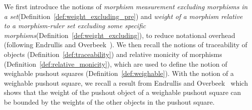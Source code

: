 
We first introduce the notions of \emph{morphism measurement excluding morphisms in a set}(Definition~\ref{def:weight_excluding_pre}) and \emph{weight of a morphism relative to a morphism-ruler set excluding some specific morphisms}(Definition~\ref{def:weight_excluding}),
to reduce notational overhead (following Endrullis and Overbeek~\cite{endrullis2024generalized_icgt}).
We then recall the notions of traceability of objects (Definition~\ref{def:traceability}) and relative monicity of morphisms (Definition~\ref{def:relative_monicity}),
which are used to define the notion of weighable pushout squares (Definition~\ref{def:weighable}). With the notion of a weighable pushout square, we recall a result from Endrullis and Overbeek~\cite{endrullis2024generalized_icgt} which shows that the weight of the pushout object of a weighable pushout square can be bounded by the weights of the other objects in the pushout square.

